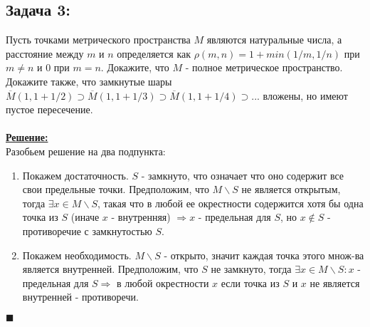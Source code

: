 \documentclass[a4paper,12pt,titlepage,final]{article}
\begin{document}
\subsection*{Задача 3:}
\noindent Пусть точками метрического пространства $M$ являются натуральные числа, а расстояние между $m$ и $n$ определяется как $\rho(m, n) = 1 + min(1/m, 1/n)$ при $m \not= n$ и $0$ при $m = n$. Докажите, что $M$ - полное метрическое пространство. Докажите также, что замкнутые шары $
\overline{M}(1, 1 + 1/2) \supset \overline{M}(1, 1 + 1/3) \supset \overline{M}(1, 1 + 1/4) \supset ...$ вложены, но имеют пустое пересечение. \\ \\
\textbf{\underline{Решение:}} \\
Разобьем решение на два подпункта:
\begin{enumerate}
    \item Покажем достаточность. $S$ - замкнуто, что означает что оно содержит все свои предельные точки. Предположим, что $M\backslash S$ не является открытым, тогда $\exists x \in M\backslash S$, такая что в любой ее окрестности содержится хотя бы одна точка из $S$ (иначе $x$ - внутренняя) $\Rightarrow x$ - предельная для $S$, но $x \not\in S$ - противоречие с замкнутостью $S$. 
    \item Покажем необходимость. $M\backslash S$ - открыто, значит каждая точка этого множ-ва является внутренней. Предположим, что $S$ не замкнуто, тогда $\exists x \in M\backslash S : x$ - предельная для $S \Rightarrow$ в любой окрестности $x$ если точка из $S$ и $x$ не является внутренней - противоречи.
\end{enumerate}
$\blacksquare$ \\ \\ \\
\end{document}
